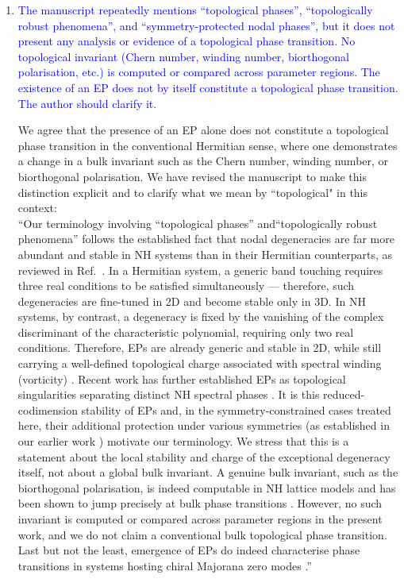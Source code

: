\documentclass[aps,prb,onecolumn,nofootinbib,citeautoscript,10pt]{revtex4-2}
\begin{document}
\begin{enumerate}
\item \textcolor{blue}{The manuscript repeatedly mentions ``topological phases'', ``topologically robust phenomena'', and ``symmetry-protected nodal phases'', but it does not present any analysis or evidence of a topological phase transition. No topological invariant (Chern number, winding number, biorthogonal polarisation, etc.) is computed or compared across parameter regions. The existence of an EP does not by itself constitute a topological phase transition. The author should clarify it.}


We agree that the presence of an EP alone does not constitute a topological phase transition in the conventional Hermitian sense, where one demonstrates a change in a bulk invariant such as the Chern number, winding number, or biorthogonal polarisation. We have revised the manuscript to make this distinction explicit and to clarify what we mean by ``topological" in this context:
\\``Our terminology involving ``topological phases'' and``topologically robust phenomena'' follows the established fact that nodal degeneracies are far more abundant and stable in NH systems than in their Hermitian counterparts, as reviewed in Ref.~\cite{emil_review}. In a Hermitian system, a generic band touching requires three real conditions to be satisfied simultaneously --- therefore, such degeneracies are fine-tuned in 2D and become stable only in 3D. In NH systems, by contrast, a degeneracy is fixed by the vanishing of the complex discriminant of the characteristic polynomial, requiring only two real conditions. Therefore, EPs are already generic and stable in 2D, while still carrying a well-defined topological charge associated with spectral winding (vorticity) \cite{Shen2018, Kawabata2019}. Recent work has further established EPs as topological singularities separating distinct NH spectral phases \cite{flore-elisabet, flore-elisabet0, ips-bp}. It is this reduced-codimension stability of EPs and, in the symmetry-constrained cases treated here, their additional protection under various symmetries (as established in our earlier work \cite{ips-emil}) motivate our terminology. We stress that this is a statement about the local stability and charge of the exceptional degeneracy itself, not about a global bulk invariant. A genuine bulk invariant, such as the biorthogonal polarisation, is indeed computable in NH lattice models and has been shown to jump precisely at bulk phase transitions \cite{flore-elisabet, flore-elisabet0, ips-bp}. However, no such invariant is computed or compared across parameter regions in the present work, and we do not claim a conventional bulk topological phase transition. Last but not the least, emergence of EPs do indeed characterise phase transitions in systems hosting chiral Majorana zero modes \cite{ips-ep-epl, ips-tewari}.''





\end{enumerate}
\end{document}
